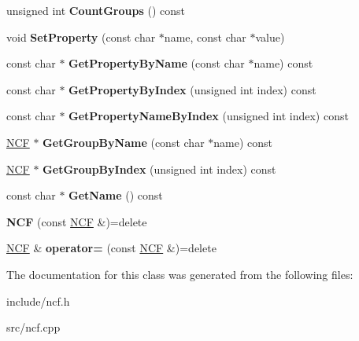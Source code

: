 \begin{DoxyCompactItemize}
unsigned int {\bfseries Count\+Groups} () const
\item 
\mbox{\label{class_blade_1_1_n_c_f_aca49d89ab36e6233da20cb89ebfba03f}} 
void {\bfseries Set\+Property} (const char $\ast$name, const char $\ast$value)
\item 
\mbox{\label{class_blade_1_1_n_c_f_afc76559d747e2ff4a790e41f27317773}} 
const char $\ast$ {\bfseries Get\+Property\+By\+Name} (const char $\ast$name) const
\item 
\mbox{\label{class_blade_1_1_n_c_f_a2cbbea6126f06913ff3ddabaa0d3a0a8}} 
const char $\ast$ {\bfseries Get\+Property\+By\+Index} (unsigned int index) const
\item 
\mbox{\label{class_blade_1_1_n_c_f_afa56a28ff9b12f922c51fe2baf7eed50}} 
const char $\ast$ {\bfseries Get\+Property\+Name\+By\+Index} (unsigned int index) const
\item 
\mbox{\label{class_blade_1_1_n_c_f_a956eca2a28ecf9f02e707610f2023893}} 
\hyperlink{class_blade_1_1_n_c_f}{N\+CF} $\ast$ {\bfseries Get\+Group\+By\+Name} (const char $\ast$name) const
\item 
\mbox{\label{class_blade_1_1_n_c_f_a6c9b4eff03b22bd7209a26e687fd8c39}} 
\hyperlink{class_blade_1_1_n_c_f}{N\+CF} $\ast$ {\bfseries Get\+Group\+By\+Index} (unsigned int index) const
\item 
\mbox{\label{class_blade_1_1_n_c_f_aae88a3edcbc65daed7031c33dae14326}} 
const char $\ast$ {\bfseries Get\+Name} () const
\item 
\mbox{\label{class_blade_1_1_n_c_f_af6c4e7db67263bca7c6222f30481c4c5}} 
{\bfseries N\+CF} (const \hyperlink{class_blade_1_1_n_c_f}{N\+CF} \&)=delete
\item 
\mbox{\label{class_blade_1_1_n_c_f_af9c0395ef323de8a3a832f7a4b189339}} 
\hyperlink{class_blade_1_1_n_c_f}{N\+CF} \& {\bfseries operator=} (const \hyperlink{class_blade_1_1_n_c_f}{N\+CF} \&)=delete
\end{DoxyCompactItemize}


The documentation for this class was generated from the following files\+:\begin{DoxyCompactItemize}
\item 
include/ncf.\+h\item 
src/ncf.\+cpp\end{DoxyCompactItemize}

